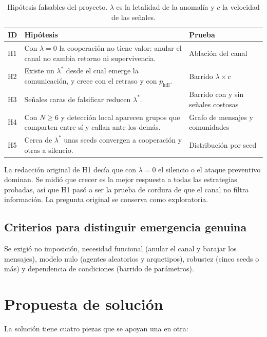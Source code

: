 \documentclass[11pt,a4paper]{article}
\begin{document}
\begin{table}[H]
\centering\small
\begin{tabular}{@{}l p{9.2cm} p{3.2cm}@{}}
\toprule
ID & Hip\'otesis & Prueba \\
\midrule
H1 & Con $\lambda=0$ la cooperaci\'on no tiene valor: anular el canal no cambia retorno ni supervivencia. & Ablaci\'on del canal \\
H2 & Existe un $\lambda^*$ desde el cual emerge la comunicaci\'on, y crece con el retraso y con $p_{\text{kill}}$. & Barrido $\lambda\times c$ \\
H3 & Se\~nales caras de falsificar reducen $\lambda^*$. & Barrido con y sin se\~nales costosas \\
H4 & Con $N\ge 6$ y detecci\'on local aparecen grupos que comparten entre s\'i y callan ante los dem\'as. & Grafo de mensajes y comunidades \\
H5 & Cerca de $\lambda^*$ unas seeds convergen a cooperaci\'on y otras a silencio. & Distribuci\'on por seed \\
\bottomrule
\end{tabular}
\caption{Hip\'otesis falsables del proyecto. $\lambda$ es la letalidad de la anomal\'ia y $c$ la velocidad de las se\~nales.}
\end{table}

La redacci\'on original de H1 dec\'ia que con $\lambda=0$ el silencio o el ataque preventivo dominan. Se midi\'o que crecer es la mejor respuesta a todas las estrategias probadas, as\'i que H1 pas\'o a ser la prueba de cordura de que el canal no filtra informaci\'on. La pregunta original se conserva como exploratoria.

\subsection{Criterios para distinguir emergencia genuina}

Se exigi\'o no imposici\'on, necesidad funcional (anular el canal y barajar los mensajes), modelo nulo (agentes aleatorios y arquetipos), robustez (cinco seeds o m\'as) y dependencia de condiciones (barrido de par\'ametros).

\section{Propuesta de soluci\'on}

La soluci\'on tiene cuatro piezas que se apoyan una en otra:
\end{document}
